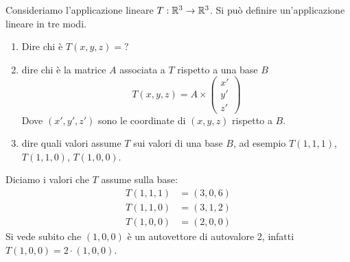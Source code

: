 \begin{exmp}
Consideriamo l'applicazione lineare $T : \mathbb{R}^3 \to \mathbb{R}^3$. Si pu\`o definire un'applicazione lineare in tre modi.
\begin{enumerate}
    \item Dire chi \`e $T(x,y,z) = ?$
    \item dire chi \`e la matrice $A$ associata a $T$ rispetto a una base $B$
    \[
    T(x,y,z) = A \times 
    \begin{pmatrix}
    x' \\ y' \\ z'
    \end{pmatrix}
    \]
    Dove $(x', y', z')$ sono le coordinate di $(x,y,z)$ rispetto a $B$.
    \item dire quali valori assume $T$ sui valori di una base $B$, ad esempio $T(1,1,1)$, $T(1,1,0)$, $T(1,0,0)$.
\end{enumerate}
Diciamo i valori che $T$ assume sulla base:
\begin{align*}
T(1,1,1) &= (3,0,6) \\
T(1,1,0) &= (3,1,2) \\
T(1,0,0) &= (2,0,0)
\end{align*}
Si vede subito che $(1,0,0)$ \`e un autovettore di autovalore 2, infatti $T(1,0,0) = 2 \cdot (1,0,0)$.


\end{exmp}
